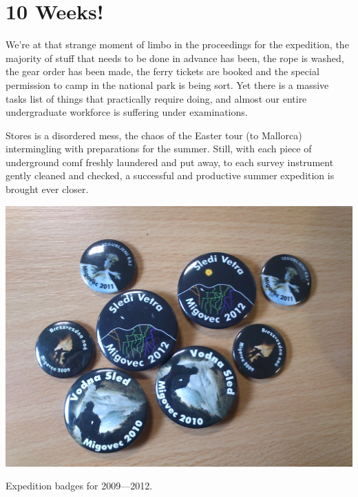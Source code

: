 \section{10 Weeks!}

We’re at that strange moment of limbo in the proceedings for the expedition, the majority of stuff that needs to be done in advance has been, the rope is washed, the gear order has been made, the ferry tickets are booked and the special permission to camp in the national park is being sort. Yet there is a massive tasks list of things that practically require doing, and almost our entire undergraduate workforce is suffering under examinations.


Stores is a disordered mess, the chaos of the Easter tour (to Mallorca) intermingling with preparations for the summer. Still, with each piece of underground comf freshly laundered and put away, to each survey instrument gently cleaned and checked, a successful and productive summer expedition is brought ever closer.


\begin{pagefigure}
\checkoddpage \ifoddpage \forcerectofloat \else \forceversofloat \fi
   \centering
\includegraphics[width = \textwidth]{2012/10_weeks/2012-02-10-2045JarvistMooreFrost-DSC_0203--orig.jpg}
\caption{Expedition badges for 2009---2012. } \label{expo badges}
\end{pagefigure}
